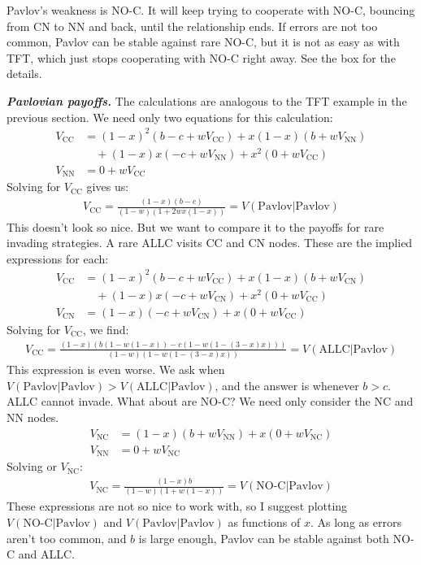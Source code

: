 \documentclass[10pt,reqno]{amsbook}
\numberwithin{equation}{chapter}
\newenvironment{mathbox}[2]
{\begin{table}[#1]
\justify\begin{tcolorbox}[enhanced, oversize]\footnotesize\noindent\textbf{\emph{#2}}}
{\end{tcolorbox}\end{table}}
\begin{document}
Pavlov's weakness is NO-C. It will keep trying to cooperate with NO-C, bouncing from CN to NN and back, until the relationship ends. If errors are not too common, Pavlov can be stable against rare NO-C, but it is not as easy as with TFT, which just stops cooperating with NO-C right away. See the box for the details.



\begin{mathbox}{b}{Pavlovian payoffs.}
The calculations are analogous to the TFT example in the previous section. We need only two equations for this calculation:
\begin{align*}
	V_\text{CC} &= (1-x)^2(b-c + w V_\text{CC}) + x(1-x)(b+wV_\text{NN}) \\
	& \quad + (1-x)x(-c+wV_\text{NN}) + x^2(0+wV_\text{CC}) \\
	V_\text{NN} &= 0 + wV_\text{CC}
\end{align*}
Solving for $V_\text{CC}$ gives us:
\begin{align*}
	V_\text{CC} = \frac{(1-x) (b-c)}{(1-w) (1 + 2 w x(1-x))} = V(\text{Pavlov}|\text{Pavlov})
\end{align*}
This doesn't look so nice. But we want to compare it to the payoffs for rare invading strategies. A rare ALLC visits CC and CN nodes. These are the implied expressions for each:
\begin{align*}
	V_\text{CC} &= (1-x)^2(b-c + w V_\text{CC}) + x(1-x)(b+wV_\text{CN}) \\
	& \quad + (1-x)x(-c+wV_\text{CN}) + x^2(0+wV_\text{CC}) \\
	V_\text{CN} &= (1-x)(-c + w V_\text{CN}) + x(0+w V_\text{CC})
\end{align*}
Solving for $V_\text{CC}$, we find:
\begin{align*}
	V_\text{CC} = \frac{(1-x) (b (1-w (1-x))-c (1-w (1-(3-x) x)))}{(1-w) (1-w (1-(3-x) x))} = V(\text{ALLC}|\text{Pavlov})
\end{align*}
This expression is even worse. We ask when $V(\text{Pavlov}|\text{Pavlov}) > V(\text{ALLC}|\text{Pavlov})$, and the answer is whenever $b>c$. ALLC cannot invade. What about are NO-C? We need only consider the NC and NN nodes.
\begin{align*}
	V_\text{NC} &= (1-x)(b+w V_\text{NN}) + x(0 + w V_\text{NC}) \\
	V_\text{NN} &= 0 + w V_\text{NC}
\end{align*}
Solving or $V_\text{NC}$:
\begin{align*}
	V_\text{NC} = \frac{(1-x) b }{(1-w) (1+w (1-x))} = V(\text{NO-C}|\text{Pavlov})
\end{align*}
These expressions are not so nice to work with, so I suggest plotting $V(\text{NO-C}|\text{Pavlov})$ and $V(\text{Pavlov}|\text{Pavlov})$ as functions of $x$. As long as errors aren't too common, and $b$ is large enough, Pavlov can be stable against both NO-C and ALLC.

\end{mathbox}
\end{document}
